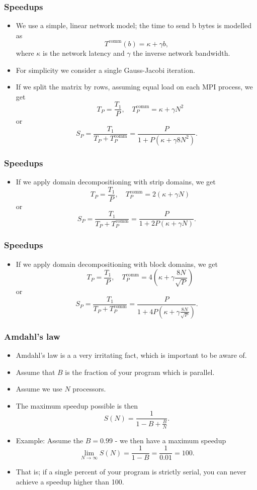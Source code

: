 \documentclass{beamer}
\begin{document}
\begin{frame}\frametitle{Speedups}
  \begin{itemize}
    \item We use a simple, linear network model; the time to send b bytes is modelled as
      \[
        T^{\text{comm}}(b) = \kappa + \gamma b,
      \]
      where $\kappa$ is the network latency and $\gamma$ the inverse network bandwidth.
    \item For simplicity we consider a single Gauss-Jacobi iteration.
    \item If we split the matrix by rows, assuming equal load on each MPI process, we get
      \[
        \quad T_P = \frac{T_1}{P}, \quad T_P^{\text{comm}} = \kappa + \gamma N^2
      \]
      or
      \[
        S_P = \frac{T_1}{T_P+T_P^{\text{comm}}} = \frac{P}{1+P\left(\kappa+\gamma 8N^2\right)}.
      \]
  \end{itemize}
\end{frame}
\begin{frame}\frametitle{Speedups}
  \begin{itemize}
    \item If we apply domain decompositioning with strip domains, we get
      \[
        \quad T_P = \frac{T_1}{P}, \quad T_P^{\text{comm}} = 2\left(\kappa + \gamma N\right)
      \]
      or
      \[
        S_P = \frac{T_1}{T_P+T_P^{\text{comm}}} = \frac{P}{1+2P\left(\kappa+\gamma N\right)}.
      \]
  \end{itemize}
\end{frame}
\begin{frame}\frametitle{Speedups}
  \begin{itemize}
    \item If we apply domain decompositioning with block domains, we get
      \[
        \quad T_P = \frac{T_1}{P}, \quad T_P^{\text{comm}} = 4\left(\kappa + \gamma \frac{8N}{\sqrt{P}}\right)
      \]
      or
      \[
        S_P = \frac{T_1}{T_P+T_P^{\text{comm}}} = \frac{P}{1+4P\left(\kappa+\gamma \frac{8N}{\sqrt{P}}\right)}.
      \]
  \end{itemize}
\end{frame}
\begin{frame}\frametitle{Amdahl's law}
  \begin{itemize}
    \item Amdahl's law is a a very irritating fact, which is important to be aware of.
    \item Assume that $B$ is the fraction of your program which is parallel.
    \item Assume we use $N$ processors.
    \item The maximum speedup possible is then
      \[
        S(N) = \frac{1}{1-B+\frac{B}{N}}.
      \]
    \item Example: Assume the $B=0.99$ - we then have a maximum speedup
      \[
        \lim_{N\rightarrow\infty} S(N) = \frac{1}{1-B} = \frac{1}{0.01} = 100.
      \]
    \item That is; if a single percent of your program is strictly serial, you can
      never achieve a speedup higher than 100.
  \end{itemize}
\end{frame}
\end{document}
